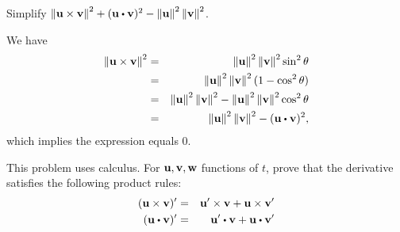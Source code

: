\begin{ex}
  Simplify
  $\norm{\vect{u}\times \vect{v}}^2+(\vect{u}\dotprod
    \vect{v})^2-\norm{\vect{u}}^2\norm{\vect{v}}^2$.
  \begin{sol}
    We have
    \begin{eqnarray*}
      \norm{\vect{u}\times \vect{v}}^2
      &=&\norm{\vect{u}
          }^2\norm{\vect{v}}^2\sin^2\theta \\
      &=&\norm{\vect{u}}^2\norm{\vect{v}}^2(1-\cos^2\theta) \\
      &=&\norm{\vect{u}}^2\norm{\vect{v}}^2
          -\norm{\vect{u}}^2\norm{\vect{v}}^2\cos^2\theta \\
      &=&\norm{\vect{u}}^2\norm{\vect{v}}^2
          -(\vect{u}\dotprod \vect{v})^2,
    \end{eqnarray*}
    which implies the expression equals $0$.
  \end{sol}
\end{ex}

\begin{ex}
  This problem uses calculus. For $\vect{u},\vect{v},\vect{w}$
  functions of $t$, prove that the derivative satisfies the following
  product rules:
  \begin{eqnarray*}
    (\vect{u}\times \vect{v})^{\prime}
    &=&\vect{u}^{\prime}\times
        \vect{v}+\vect{u}\times \vect{v}^{\prime} \\
    (\vect{u}\dotprod \vect{v})^{\prime}
    &=&\vect{u}^{\prime}\dotprod
        \vect{v}+\vect{u}\dotprod \vect{v}^{\prime}
  \end{eqnarray*}
\end{ex}

